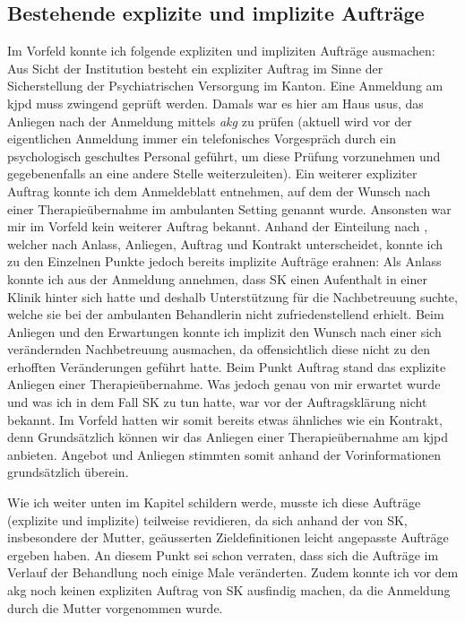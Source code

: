 \subsection{Bestehende explizite und implizite Aufträge} 
Im Vorfeld konnte ich folgende expliziten und impliziten Aufträge ausmachen: Aus Sicht der Institution besteht ein expliziter Auftrag im Sinne der Sicherstellung der Psychiatrischen Versorgung im Kanton. Eine Anmeldung am \ac{kjpd} muss zwingend geprüft werden. Damals war es hier am Haus usus, das Anliegen nach der Anmeldung mittels \textit{\ac{akg}} zu prüfen (aktuell wird vor der eigentlichen Anmeldung immer ein telefonisches Vorgespräch durch ein psychologisch geschultes Personal geführt, um diese Prüfung vorzunehmen und gegebenenfalls an eine andere Stelle weiterzuleiten). Ein weiterer expliziter Auftrag konnte ich dem Anmeldeblatt entnehmen, auf dem der Wunsch nach einer Therapieübernahme im ambulanten Setting genannt wurde. Ansonsten war mir im Vorfeld kein weiterer Auftrag bekannt. Anhand der Einteilung nach , welcher nach Anlass, Anliegen, Auftrag und Kontrakt unterscheidet, konnte ich zu den Einzelnen Punkte jedoch bereits implizite Aufträge erahnen: Als Anlass konnte ich aus der Anmeldung annehmen, dass SK einen Aufenthalt in einer Klinik hinter sich hatte und deshalb Unterstützung für die Nachbetreuung suchte, welche sie bei der ambulanten Behandlerin nicht zufriedenstellend erhielt. Beim Anliegen und den Erwartungen konnte ich implizit den Wunsch nach einer sich verändernden Nachbetreuung ausmachen, da offensichtlich diese nicht zu den erhofften Veränderungen geführt hatte. Beim Punkt Auftrag stand das explizite Anliegen einer Therapieübernahme. Was jedoch genau von mir erwartet wurde und was ich in dem Fall SK zu tun hatte, war vor der Auftragsklärung nicht bekannt. Im Vorfeld hatten wir somit bereits etwas ähnliches wie ein Kontrakt, denn Grundsätzlich können wir das Anliegen einer Therapieübernahme am \ac{kjpd} anbieten. Angebot und Anliegen stimmten somit anhand der Vorinformationen grundsätzlich überein.  

Wie ich weiter unten im Kapitel \textit{} schildern werde, musste ich diese Aufträge (explizite und implizite) teilweise revidieren, da sich anhand der von SK, insbesondere der Mutter, geäusserten Zieldefinitionen leicht angepasste Aufträge ergeben haben. An diesem Punkt sei schon verraten, dass sich die Aufträge im Verlauf der Behandlung noch einige Male veränderten. Zudem konnte ich vor dem \ac{akg} noch keinen expliziten Auftrag von SK ausfindig machen, da die Anmeldung durch die Mutter vorgenommen wurde. 

